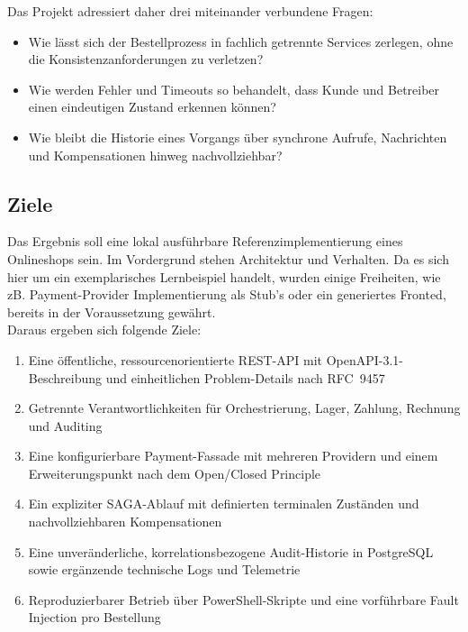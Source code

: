 \documentclass[10pt,a4paper]{article}
\newcommand{\midGap}{\vspace{12mm}}
\begin{document}
Das Projekt adressiert daher drei miteinander verbundene Fragen:

\begin{itemize}
  \item Wie lässt sich der Bestellprozess in fachlich getrennte Services
    zerlegen, ohne die Konsistenzanforderungen zu verletzen?
  \item Wie werden Fehler und Timeouts so behandelt, dass Kunde und Betreiber
    einen eindeutigen Zustand erkennen können?
  \item Wie bleibt die Historie eines Vorgangs über synchrone Aufrufe,
    Nachrichten und Kompensationen hinweg nachvollziehbar?
\end{itemize}

\midGap

\subsection{Ziele}

Das Ergebnis soll eine lokal ausführbare Referenzimplementierung eines Onlineshops sein. Im Vordergrund stehen Architektur und Verhalten. Da es sich hier um ein exemplarisches Lernbeispiel handelt, wurden einige Freiheiten, wie zB. Payment-Provider Implementierung als Stub's oder ein generiertes Fronted, bereits in der Voraussetzung gewährt.\\
Daraus ergeben sich folgende Ziele:

\begin{enumerate}
  \item Eine öffentliche, ressourcenorientierte REST-API mit OpenAPI-3.1-
    Beschreibung und einheitlichen Problem-Details nach RFC~9457
  \item Getrennte Verantwortlichkeiten für Orchestrierung, Lager, Zahlung,
    Rechnung und Auditing
  \item Eine konfigurierbare Payment-Fassade mit mehreren Providern und einem
    Erweiterungspunkt nach dem Open/Closed Principle
  \item Ein expliziter SAGA-Ablauf mit definierten terminalen Zuständen und
    nachvollziehbaren Kompensationen
  \item Eine unveränderliche, korrelationsbezogene Audit-Historie in
    PostgreSQL sowie ergänzende technische Logs und Telemetrie
  \item Reproduzierbarer Betrieb über PowerShell-Skripte und eine
    vorführbare Fault Injection pro Bestellung
\end{enumerate}
\end{document}
